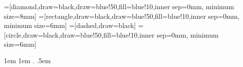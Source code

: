 


\usepackage[textsize=tiny]{todonotes}

\usepackage{enumerate}
\usepackage{amsmath}
\usepackage{amsfonts}
\usepackage{amssymb}
\usepackage{amsbsy}
\usepackage{bbm}
\usepackage{isomath}
\usepackage{amsthm}
\usepackage{dsfont}
\usepackage{algorithm}
\usepackage{algpseudocode}
\usepackage{mathrsfs}
\usepackage{paralist}
\usepackage{epsfig}
\usepackage[caption=false]{subfig}
\usepackage{makeidx} 
\usepackage{mathtools}
\usepackage{pgf}
\usepackage{tikz}
\usepackage{pgfplots}
\usepackage{gnuplot-lua-tikz}
\usepackage{pgfplotstable}

\pgfplotsset{compat=newest}
\usetikzlibrary{external}
\usetikzlibrary{automata,topaths,shapes,arrows,fit,decorations.markings}
=[diamond,draw=black,draw=blue!50,fill=blue!10,inner sep=0mm, minimum size=8mm]
=[rectangle,draw=black,draw=blue!50,fill=blue!10,inner sep=0mm, minimum size=6mm]
=[dashed,draw=black]
=[circle,draw=black,draw=blue!50,fill=blue!10,inner sep=0mm, minimum size=6mm]



\theoremstyle{plain}
\newtheorem{corollary}{Corollary}
\newtheorem{lemma}{Lemma}
\newtheorem{theorem}{Theorem}
\newtheorem{assumption}{Assumption}
\newtheorem{fact}{Fact}

\theoremstyle{definition}
\newtheorem{definition}{Definition}

\theoremstyle{remark}
\newtheorem{conjecture}{Conjecture}
\newtheorem{remark}{Remark}
\newtheorem{claim}{Claim}

{1em}       %
{1em}       %
{\small}      %
{}          %
{\scshape}  %
{.}         %
{.5em}      %
{}          %
\theoremstyle{example}
\newtheorem{example}{Example}
\newtheorem{comment}{Comment}

